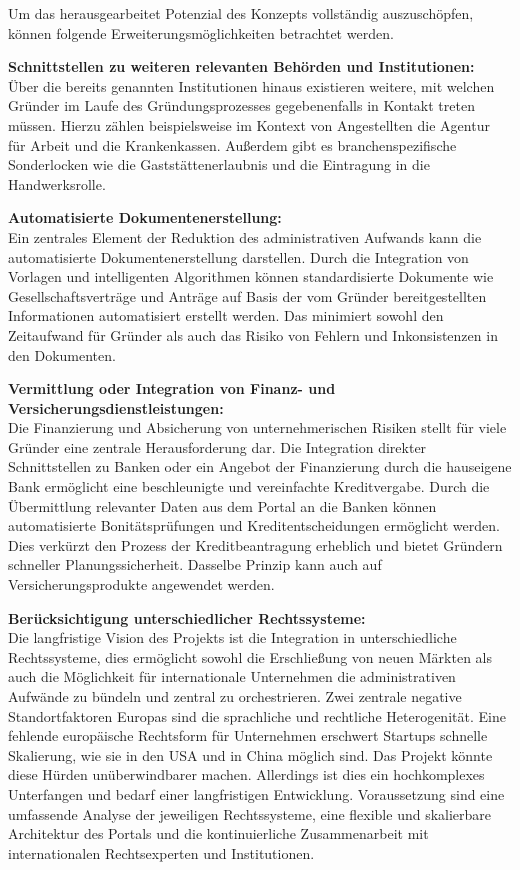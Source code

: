 Um das herausgearbeitet Potenzial des Konzepts vollständig auszuschöpfen, können folgende Erweiterungsmöglichkeiten betrachtet werden.

\textbf{Schnittstellen zu weiteren relevanten Behörden und Institutionen:} \\
Über die bereits genannten Institutionen hinaus existieren weitere, mit welchen Gründer im Laufe des Gründungsprozesses gegebenenfalls in Kontakt treten müssen.
Hierzu zählen beispielsweise im Kontext von Angestellten die Agentur für Arbeit und die Krankenkassen.
Außerdem gibt es branchenspezifische Sonderlocken wie die Gaststättenerlaubnis und die Eintragung in die Handwerksrolle.

\textbf{Automatisierte Dokumentenerstellung:} \\
Ein zentrales Element der Reduktion des administrativen Aufwands kann die automatisierte Dokumentenerstellung darstellen.
Durch die Integration von Vorlagen und intelligenten Algorithmen können standardisierte Dokumente wie Gesellschaftsverträge und Anträge auf Basis der vom Gründer bereitgestellten Informationen automatisiert erstellt werden.
Das minimiert sowohl den Zeitaufwand für Gründer als auch das Risiko von Fehlern und Inkonsistenzen in den Dokumenten.

\textbf{Vermittlung oder Integration von Finanz- und Versicherungsdienstleistungen:} \\
Die Finanzierung und Absicherung von unternehmerischen Risiken stellt für viele Gründer eine zentrale Herausforderung dar.
Die Integration direkter Schnittstellen zu Banken oder ein Angebot der Finanzierung durch die hauseigene Bank ermöglicht eine beschleunigte und vereinfachte Kreditvergabe.
Durch die Übermittlung relevanter Daten aus dem Portal an die Banken können automatisierte Bonitätsprüfungen und Kreditentscheidungen ermöglicht werden. Dies verkürzt den Prozess der Kreditbeantragung erheblich und bietet Gründern schneller Planungssicherheit.
Dasselbe Prinzip kann auch auf Versicherungsprodukte angewendet werden.

\textbf{Berücksichtigung unterschiedlicher Rechtssysteme:} \\
Die langfristige Vision des Projekts ist die Integration in unterschiedliche Rechtssysteme, dies ermöglicht sowohl die Erschließung von neuen Märkten als auch die Möglichkeit für internationale Unternehmen die administrativen Aufwände zu bündeln und zentral zu orchestrieren.
Zwei zentrale negative Standortfaktoren Europas sind die sprachliche und rechtliche Heterogenität. Eine fehlende europäische Rechtsform für Unternehmen erschwert Startups schnelle Skalierung, wie sie in den USA und in China möglich sind.
Das Projekt könnte diese Hürden unüberwindbarer machen. Allerdings ist dies ein hochkomplexes Unterfangen und bedarf einer langfristigen Entwicklung. Voraussetzung sind eine umfassende Analyse der jeweiligen Rechtssysteme, eine flexible und skalierbare Architektur des Portals und die kontinuierliche Zusammenarbeit mit internationalen Rechtsexperten und Institutionen.


